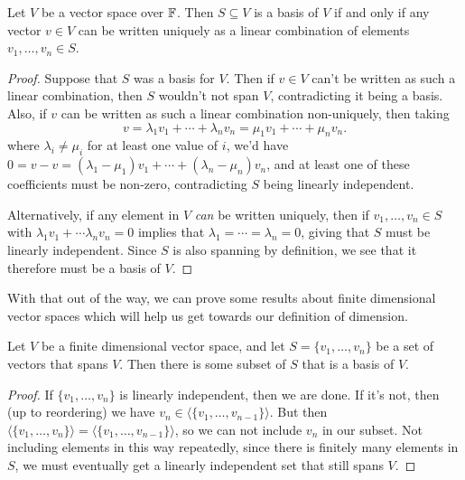 \documentclass[a4paper]{scrartcl}
\begin{document}
\begin{lemma}
    Let $V$ be a vector space over $\mathbb{F}$. Then $S \subseteq V$ is a basis of $V$ if and only if any vector $v \in V$ can be written uniquely as a linear combination of elements $v_1, \dots, v_n \in S$.
\end{lemma}
\begin{proof}
    Suppose that $S$ was a basis for $V$.
    Then if $v \in V$ can't be written as such a linear combination, then $S$ wouldn't not span $V$, contradicting it being a basis.
    Also, if $v$ can be written as such a linear combination non-uniquely, then taking
    $$
v = \lambda_1 v_1 + \cdots + \lambda_n v_n = \mu_1 v_1 + \cdots + \mu_n v_n.
    $$
    where $\lambda_i \neq \mu_i$ for at least one value of $i$, we'd have
    $0 = v - v = (\lambda_1 - \mu_1) v_1 + \cdots + (\lambda_n - \mu_n)v_n$,
    and at least one of these coefficients must be non-zero, contradicting $S$ being linearly independent.

    Alternatively, if any element in $V$ \emph{can} be written uniquely, then if $v_1, \dots, v_n \in S$ with $\lambda_1 v_1 + \cdots \lambda_n v_n = 0$ implies that $\lambda_1 = \cdots = \lambda_n = 0$, giving that $S$ must be linearly independent. Since $S$ is also spanning by definition, we see that it therefore must be a basis of $V$.
\end{proof}

With that out of the way, we can prove some results about finite dimensional vector spaces which will help us get towards our definition of dimension. 

\begin{lemma}
    Let $V$ be a finite dimensional vector space, and let $S = \{v_1, \dots, v_n\}$ be a set of vectors that spans $V$. Then there is some subset of $S$ that is a basis of $V$.
\end{lemma}
\begin{proof}
    If $\{v_1, \dots, v_n\}$ is linearly independent, then we are done. If it's not, then (up to reordering) we have $v_n \in \langle\{v_1, \dots, v_{n - 1}\}\rangle$. But then $\langle\{v_1, \dots, v_n\}\rangle = \langle\{v_1, \dots, v_{n - 1}\}\rangle$, so we can not include $v_n$ in our subset. Not including elements in this way repeatedly, since there is finitely many elements in $S$, we must eventually get a linearly independent set that still spans $V$.
\end{proof}
\end{document}
